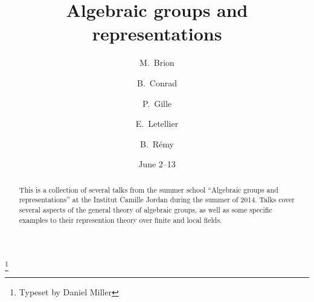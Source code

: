 \documentclass[english,letterpaper]{smfart}
\author{M.~Brion}
\author{B.~Conrad}
\author{P.~Gille}
\author{E.~Letellier}
\author{B.~R\'emy}
\title[Algebraic groups]{Algebraic groups and representations}
\date{June 2--13}
\begin{document}
\frontmatter

\begin{abstract}
This is a collection of several talks from the summer school ``Algebraic 
groups and representations'' at the Institut Camille Jordan during the 
summer of 2014.
Talks cover several aspects of the general theory of algebraic groups, as well 
as some specific examples to their represention theory over finite and local 
fields. 
\end{abstract}

\thanks{Typeset by Daniel Miller}

\maketitle
\tableofcontents
\mainmatter














\backmatter


\end{document}
